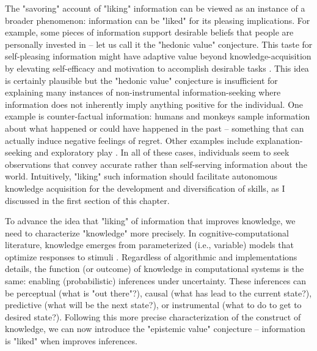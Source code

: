 The "savoring" account of "liking" information can be viewed as an instance of a broader phenomenon: information can be "liked" for its pleasing implications. For example, some pieces of information support desirable beliefs that people are personally invested in \cite[e.g., confirmation bias][]{nickerson_confirmation_1998} -- let us call it the "hedonic value" conjecture. This taste for self-pleasing information might have adaptive value beyond knowledge-acquisition by elevating self-efficacy and motivation to accomplish desirable tasks \cite{bromberg-martin_value_2020,blain_intrinsic_2021}. This idea is certainly plausible but the "hedonic value" conjecture is insufficient for explaining many instances of non-instrumental information-seeking where information does not inherently imply anything positive for the individual. One example is counter-factual information: humans \cite{fitzgibbon_lure_2021} and monkeys \cite{wang_monkeys_2019} sample information about what happened or could have happened in the past -- something that can actually induce negative feelings of regret. Other examples include explanation-seeking \cite{coenen_asking_2019,liquin_explanation-seeking_2020} and exploratory play \cite{cook_where_2011,chu_play_2020}. In all of these cases, individuals seem to seek observations that convey accurate rather than self-serving information about the world. Intuitively, "liking" such information should facilitate autonomous knowledge acquisition for the development and diversification of skills, as I discussed in the first section of this chapter.

To advance the idea that "liking" of information that improves knowledge, we need to characterize "knowledge" more precisely. In cognitive-computational literature, knowledge emerges from parameterized (i.e., variable) models that optimize responses to stimuli \cite[e.g., connectionist and probabilistic cognitive models models][]{mcclelland_letting_2010,griffiths_probabilistic_2010}. Regardless of algorithmic and implementations details, the function (or outcome) of knowledge in computational systems is the same: enabling (probabilistic) inferences under uncertainty. These inferences can be perceptual (what is "out there"?), causal (what has lead to the current state?), predictive (what will be the next state?), or instrumental (what to do to get to desired state?). Following this more precise characterization of the construct of knowledge, we can now introduce the "epistemic value" conjecture -- information is "liked" when improves inferences.

